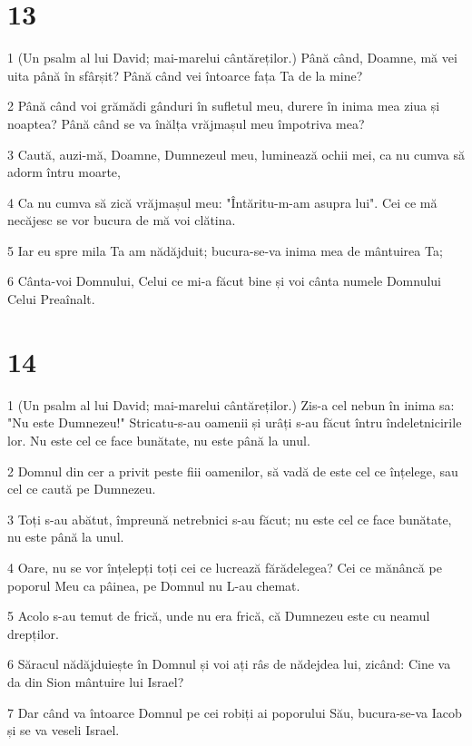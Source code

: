 \chapter{13}

\par 1 (Un psalm al lui David; mai-marelui cântăreților.) Până când, Doamne, mă vei uita până în sfârșit? Până când vei întoarce fața Ta de la mine?
\par 2 Până când voi grămădi gânduri în sufletul meu, durere în inima mea ziua și noaptea? Până când se va înălța vrăjmașul meu împotriva mea?
\par 3 Caută, auzi-mă, Doamne, Dumnezeul meu, luminează ochii mei, ca nu cumva să adorm întru moarte,
\par 4 Ca nu cumva să zică vrăjmașul meu: "Întăritu-m-am asupra lui". Cei ce mă necăjesc se vor bucura de mă voi clătina.
\par 5 Iar eu spre mila Ta am nădăjduit; bucura-se-va inima mea de mântuirea Ta;
\par 6 Cânta-voi Domnului, Celui ce mi-a făcut bine și voi cânta numele Domnului Celui Preaînalt.

\chapter{14}

\par 1 (Un psalm al lui David; mai-marelui cântăreților.) Zis-a cel nebun în inima sa: "Nu este Dumnezeu!" Stricatu-s-au oamenii și urâți s-au făcut întru îndeletnicirile lor. Nu este cel ce face bunătate, nu este până la unul.
\par 2 Domnul din cer a privit peste fiii oamenilor, să vadă de este cel ce înțelege, sau cel ce caută pe Dumnezeu.
\par 3 Toți s-au abătut, împreună netrebnici s-au făcut; nu este cel ce face bunătate, nu este până la unul.
\par 4 Oare, nu se vor înțelepți toți cei ce lucrează fărădelegea? Cei ce mănâncă pe poporul Meu ca pâinea, pe Domnul nu L-au chemat.
\par 5 Acolo s-au temut de frică, unde nu era frică, că Dumnezeu este cu neamul drepților.
\par 6 Săracul nădăjduiește în Domnul și voi ați râs de nădejdea lui, zicând: Cine va da din Sion mântuire lui Israel?
\par 7 Dar când va întoarce Domnul pe cei robiți ai poporului Său, bucura-se-va Iacob și se va veseli Israel.

